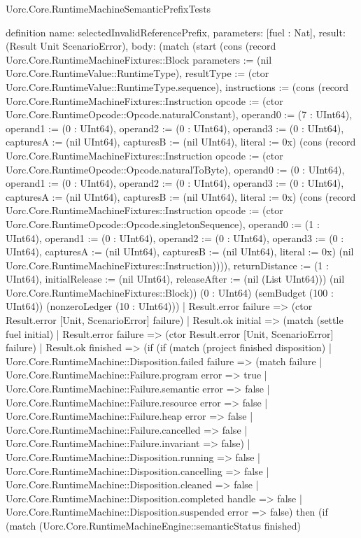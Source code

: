 \begin{lexlean}{Uorc.Core.RuntimeMachineSemanticPrefixTests}
\begin{semanticmodule}
definition{
  name: selectedInvalidReferencePrefix,
  parameters: [fuel : Nat],
  result: (Result Unit ScenarioError),
  body: (match (start (cons (record Uorc.Core.RuntimeMachineFixtures::Block {parameters := (nil Uorc.Core.RuntimeValue::RuntimeType), resultType := (ctor Uorc.Core.RuntimeValue::RuntimeType.sequence), instructions := (cons (record Uorc.Core.RuntimeMachineFixtures::Instruction {opcode := (ctor Uorc.Core.RuntimeOpcode::Opcode.naturalConstant), operand0 := (7 : UInt64), operand1 := (0 : UInt64), operand2 := (0 : UInt64), operand3 := (0 : UInt64), capturesA := (nil UInt64), capturesB := (nil UInt64), literal := 0x}) (cons (record Uorc.Core.RuntimeMachineFixtures::Instruction {opcode := (ctor Uorc.Core.RuntimeOpcode::Opcode.naturalToByte), operand0 := (0 : UInt64), operand1 := (0 : UInt64), operand2 := (0 : UInt64), operand3 := (0 : UInt64), capturesA := (nil UInt64), capturesB := (nil UInt64), literal := 0x}) (cons (record Uorc.Core.RuntimeMachineFixtures::Instruction {opcode := (ctor Uorc.Core.RuntimeOpcode::Opcode.singletonSequence), operand0 := (1 : UInt64), operand1 := (0 : UInt64), operand2 := (0 : UInt64), operand3 := (0 : UInt64), capturesA := (nil UInt64), capturesB := (nil UInt64), literal := 0x}) (nil Uorc.Core.RuntimeMachineFixtures::Instruction)))), returnDistance := (1 : UInt64), initialRelease := (nil UInt64), releaseAfter := (nil (List UInt64))}) (nil Uorc.Core.RuntimeMachineFixtures::Block)) (0 : UInt64) (semBudget (100 : UInt64)) (nonzeroLedger (10 : UInt64)))
    | Result.error failure => (ctor Result.error [Unit, ScenarioError] failure)
    | Result.ok initial => (match (settle fuel initial)
      | Result.error failure => (ctor Result.error [Unit, ScenarioError] failure)
      | Result.ok finished => (if (if (match (project finished disposition)
        | Uorc.Core.RuntimeMachine::Disposition.failed failure => (match failure
          | Uorc.Core.RuntimeMachine::Failure.program error => true
          | Uorc.Core.RuntimeMachine::Failure.semantic error => false
          | Uorc.Core.RuntimeMachine::Failure.resource error => false
          | Uorc.Core.RuntimeMachine::Failure.heap error => false
          | Uorc.Core.RuntimeMachine::Failure.cancelled => false
          | Uorc.Core.RuntimeMachine::Failure.invariant => false)
        | Uorc.Core.RuntimeMachine::Disposition.running => false
        | Uorc.Core.RuntimeMachine::Disposition.cancelling => false
        | Uorc.Core.RuntimeMachine::Disposition.cleaned => false
        | Uorc.Core.RuntimeMachine::Disposition.completed handle => false
        | Uorc.Core.RuntimeMachine::Disposition.suspended error => false) then (if (match (Uorc.Core.RuntimeMachineEngine::semanticStatus finished)
}
\end{semanticmodule}
\end{lexlean}
